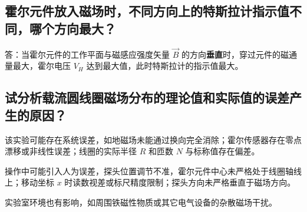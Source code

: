 \documentclass{../../templates/Report}%
\begin{document}
\begin{fullreportonly}
    \subsection{霍尔元件放入磁场时，不同方向上的特斯拉计指示值不同，哪个方向最大？}
    答：当霍尔元件的工作平面与磁感应强度矢量 $\vec{B}$ 的方向\textbf{垂直}时，穿过元件的磁通量最大，霍尔电压 $V_H$ 达到最大值，此时特斯拉计的指示值最大。

    \subsection{试分析载流圆线圈磁场分布的理论值和实际值的误差产生的原因？}
    该实验可能存在系统误差，如地磁场未能通过换向完全消除；霍尔传感器存在零点漂移或非线性误差；线圈的实际半径 $R$ 和匝数 $N$ 与标称值存在偏差。

    操作中可能引入人为误差，探头位置调节不准，霍尔元件中心未严格处于线圈轴线上；移动坐标 $x$ 时读数视差或标尺精度限制；探头方向未严格垂直于磁场方向。

    实验室环境也有影响，如周围铁磁性物质或其它电气设备的杂散磁场干扰。
\end{fullreportonly}
\insertnotes
\end{document}
